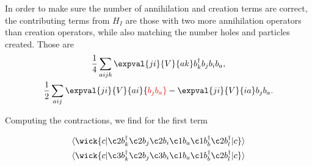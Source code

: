 \begin{comment}
    Considering the one-body part, we have
    \begin{align*}
        \expval{c}{\hat{H}_0}{\Phi_i^a} &= \sum_{\alpha\beta} \expval{\alpha}{\hat{h}_0}{\beta} \expval{c}{a_\alpha^\dagger a_\beta}{\Phi_i^a} \\
        &= \sum_{\alpha\beta} \expval{\alpha}{\hat{h}_0}{\beta} \expval{c}{a_\alpha^\dagger a_\beta a_a^\dagger a_i}{c}. \\
    \end{align*}
    The only possible contraction is
    \begin{equation*}
        \langle
        \wick{
            c
            \vert
            \c2 a_\alpha^\dagger \c1 a_\beta \c1 a_a^\dagger \c2 a_i
            \vert
            c
        }
        \rangle,
    \end{equation*}
    such that $\alpha = i$ and $\beta = a$.
    The expectation value of the one-body part is then
    \begin{equation*}
        \expval{c}{\hat{H}_0}{\Phi_i^a} = \sum_{\alpha \beta} \expval{\alpha}{\hat{h}_0}{\beta} \delta_{\alpha i} \delta_{\beta a} = \expval{i}{\hat{h}_0}{a} = 0,
    \end{equation*}
    which vanishes due to the $\delta_{ij}$ term of Eq.~\eqref{eq:onebody}.
\end{comment}

In order to make sure the number of annihilation and creation terms are correct, the contributing terms from $H_I$ are those with two more annihilation operators than creation operators, while also matching the number holes and particles created.
Those are
\begin{gather*}
    \frac{1}{4} \sum_{aijk} \expval{ji}{V}{ak} b_k^\dagger b_j b_i b_a,\\
    \frac{1}{2} \sum_{aij} \expval{ji}{V}{ai} {\color{red} b_j b_a} - \expval{ji}{V}{ia} b_j b_a.
\end{gather*}

Computing the contractions, we find for the first term
\begin{comment}
    Dobbelt sjekk her du August
    https://en.wikipedia.org/wiki/Wick%
\end{comment}
\begin{align*}
    \langle
    \wick{
        c
        \vert
        \c2 b_k^\dagger \c2 b_j \c2 b_i \c1 b_a \c1 b_b^\dagger \c2 b_l^\dagger
        \vert
        c
    }
    \rangle & \\
    \langle
    \wick{
        c
        \vert
        \c3 b_k^\dagger \c2 b_j \c3 b_i \c1 b_a \c1 b_b^\dagger \c2 b_l^\dagger
        \vert
        c
    }
    \rangle &
\end{align*}

